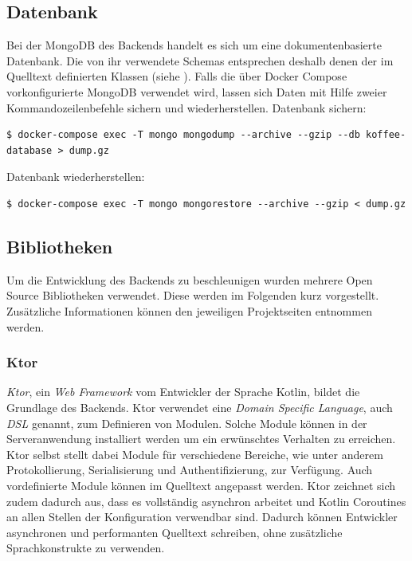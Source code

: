 \documentclass[a4paper, 11pt]{article}
\begin{document}
\subsection{Datenbank}
\label{subsec:backend:database}
Bei der MongoDB des Backends handelt es sich um eine dokumentenbasierte Datenbank.
Die von ihr verwendete Schemas entsprechen deshalb denen der im Quelltext definierten Klassen (siehe ).
Falls die über Docker Compose vorkonfigurierte MongoDB verwendet wird, lassen sich Daten mit Hilfe zweier Kommandozeilenbefehle sichern und wiederherstellen.
\linebreak
\linebreak
\noindent Datenbank sichern:
\begin{lstlisting}[style=indentedCommand]
$ docker-compose exec -T mongo mongodump --archive --gzip --db koffee-database > dump.gz
\end{lstlisting}
\noindent Datenbank wiederherstellen:
\begin{lstlisting}[style=indentedCommand]
$ docker-compose exec -T mongo mongorestore --archive --gzip < dump.gz
\end{lstlisting}

\subsection{Bibliotheken}
\label{subsec:backend:bibs}
Um die Entwicklung des Backends zu beschleunigen wurden mehrere Open Source Bibliotheken verwendet.
Diese werden im Folgenden kurz vorgestellt.
Zusätzliche Informationen können den jeweiligen Projektseiten entnommen werden.

\subsubsection{Ktor}
\label{subsubsec:backend:bibs:ktor}
\textit{Ktor}, ein \textit{Web Framework} vom Entwickler der Sprache Kotlin, bildet die Grundlage des Backends.
Ktor verwendet eine \textit{Domain Specific Language}, auch \textit{DSL} genannt, zum Definieren von Modulen.
Solche Module können in der Serveranwendung installiert werden um ein erwünschtes Verhalten zu erreichen.
Ktor selbst stellt dabei Module für verschiedene Bereiche, wie unter anderem Protokollierung, Serialisierung und Authentifizierung, zur Verfügung.
Auch vordefinierte Module können im Quelltext angepasst werden.
Ktor zeichnet sich zudem dadurch aus, dass es vollständig asynchron arbeitet und Kotlin Coroutines an allen Stellen der Konfiguration verwendbar sind.
Dadurch können Entwickler asynchronen und performanten Quelltext schreiben, ohne zusätzliche Sprachkonstrukte zu verwenden.
\end{document}
